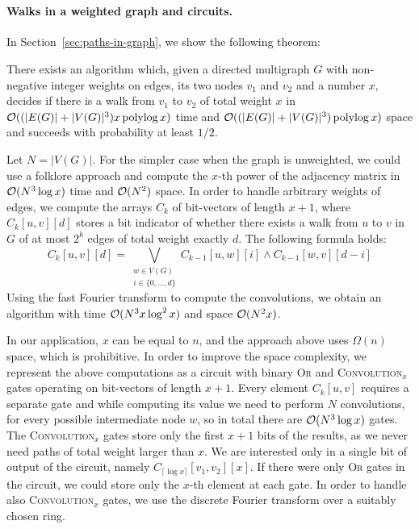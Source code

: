 \\

\paragraph{Walks in a weighted graph and circuits.} In Section~\ref{sec:paths-in-graph}, we show the following theorem:

\begin{thm}\label{thm:detecting_walk_specific_weight}
 There exists an algorithm which, given a directed multigraph $G$ with non-negative integer weights on edges, its two nodes $v_1$ and $v_2$ and a number $x$,  decides if there is a walk from $v_1$ to $v_2$ of total weight $x$ in~$\mathcal{O}((|E(G)|+|V(G)|^3)x\operatorname{polylog} x)$ time and $\mathcal{O}((|E(G)|+|V(G)|^3)\operatorname{polylog} x)$ space and succeeds with probability at least $1/2$.
\end{thm}

Let $N=|V(G)|$.
For the simpler case when the graph is unweighted, we could use a folklore approach and compute the $x$-th power of the adjacency matrix in $\mathcal{O}(N^3\log x)$ time and $\mathcal{O}(N^2)$ space.
In order to handle arbitrary weights of edges, we compute the arrays $C_k$ of bit-vectors of length $x+1$, where $C_k[u,v][d]$ stores a bit indicator of whether there exists a walk from $u$ to $v$ in $G$ of at most $2^k$ edges of total weight exactly $d$. The following formula holds:
$$C_k[u,v][d]=\bigvee_{\substack{w\in V(G) \\  i\in \{0,\ldots,d\}}} C_{k-1}[u,w][i] \wedge C_{k-1}[w,v][d-i]$$
Using the fast Fourier transform to compute the convolutions, we obtain an algorithm with time $\mathcal{O}(N^3x\log^2x)$ and space $\mathcal{O}(N^2x)$. 

In our application, $x$ can be equal to $n$, and the approach above uses $\Omega(n)$ space, which is prohibitive. 
In order to improve the space complexity, we represent the above computations as a circuit with binary \textsc{Or} and \textsc{Convolution}$_x$ gates operating on bit-vectors of length $x+1$.
Every element $C_k[u,v]$ requires a separate gate and while computing its value we need to perform $N$ convolutions, for every possible intermediate node $w$, so in total there are $\mathcal{O}(N^3\log x)$ gates.
The \textsc{Convolution}$_x$ gates store only the first $x+1$ bits of the results, as we never need paths of total weight larger than $x$.
We are interested only in a single bit of output of the circuit, namely $C_{\lceil\log x\rceil}[v_1,v_2][x]$. If there were only \textsc{Or} gates in the circuit, we could store only the $x$-th element at each gate.
In order to handle also \textsc{Convolution}$_x$ gates, we use the discrete Fourier transform over a suitably chosen ring.

